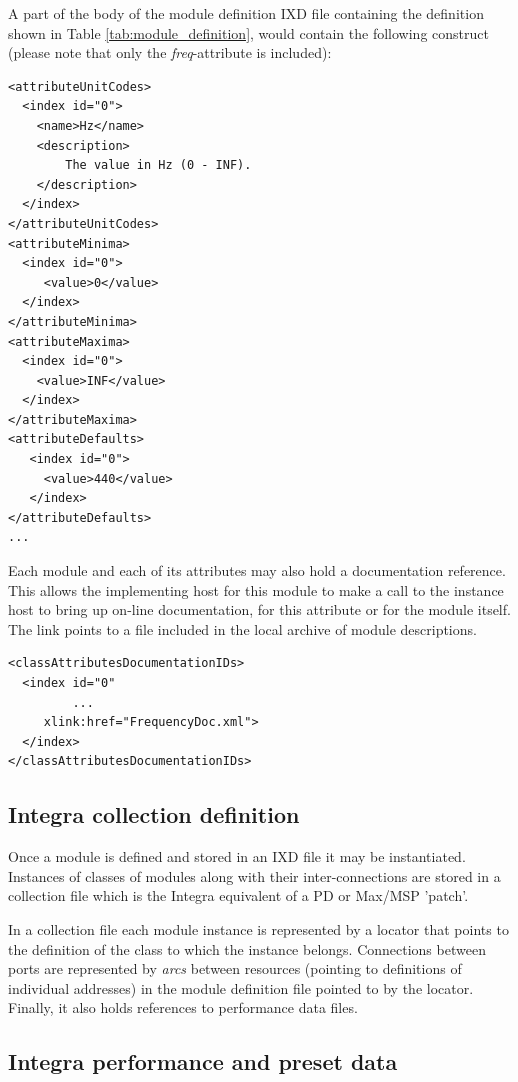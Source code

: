 A part of the body of the module definition IXD file containing the
definition shown in Table \ref{tab:module_definition}, would contain
the following construct (please note that only the
\emph{freq}-attribute is included):

{\small
\begin{verbatim}
<attributeUnitCodes> 
  <index id="0">
    <name>Hz</name>
    <description>
        The value in Hz (0 - INF).
    </description>
  </index>
</attributeUnitCodes>
<attributeMinima> 
  <index id="0">
     <value>0</value>
  </index>
</attributeMinima>
<attributeMaxima> 
  <index id="0">
    <value>INF</value>
  </index>
</attributeMaxima>
<attributeDefaults>
   <index id="0">
     <value>440</value>
   </index>
</attributeDefaults>
...
\end{verbatim}
}

Each module and each of its attributes may also hold a documentation
reference. This allows the implementing host for this module to make a
call to the instance host to bring up on-line documentation, for this
attribute or for the module itself. The link points to a file included
in the local archive of module descriptions.

{\small
\begin{verbatim}
<classAttributesDocumentationIDs>
  <index id="0"
         ...
     xlink:href="FrequencyDoc.xml">
  </index>
</classAttributesDocumentationIDs>
\end{verbatim}
}

\subsection{Integra collection definition}\label{subsect:integra_collection_definition}

Once a module is defined and stored in an IXD file it may be
instantiated. Instances of classes of modules along with their
inter-connections are stored in a collection file which is the Integra
equivalent of a PD or Max/MSP 'patch'.

In a collection file each module instance is represented by a locator
that points to the definition of the class to which the instance
belongs. Connections between ports are represented by \emph{arcs}
between resources (pointing to definitions of individual addresses) in
the module definition file pointed to by the locator. Finally, it also
holds references to performance data files.

\subsection{Integra performance and preset data}\label{subsect:integra_preset_data}

